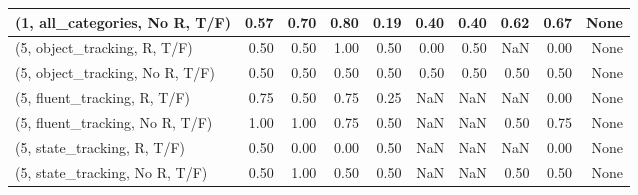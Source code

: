 \begin{table*}[h!]
\begin{adjustbox}{width=2\columnwidth,center}
\begin{tabular}{lrrr|rrr|rrr}
(1, all\_categories, No R, T/F)       &                      0.57 &                  0.70 &                      0.80 &                          0.19 &                      0.40 &                          0.40 &                                   0.62 &                               0.67 &                                  None \\



\midrule
(5, object\_tracking, R, T/F)         &                      0.50 &                  0.50 &                      1.00 &                          0.50 &                      0.00 &                          0.50 &                                    NaN &                               0.00 &                                  None \\
(5, object\_tracking, No R, T/F)      &                      0.50 &                  0.50 &                      0.50 &                          0.50 &                      0.50 &                          0.50 &                                   0.50 &                               0.50 &                                  None \\
(5, fluent\_tracking, R, T/F)         &                      0.75 &                  0.50 &                      0.75 &                          0.25 &                       NaN &                           NaN &                                    NaN &                               0.00 &                                  None \\
(5, fluent\_tracking, No R, T/F)      &                      1.00 &                  1.00 &                      0.75 &                          0.50 &                       NaN &                           NaN &                                   0.50 &                               0.75 &                                  None \\
(5, state\_tracking, R, T/F)          &                      0.50 &                  0.00 &                      0.00 &                          0.50 &                       NaN &                           NaN &                                    NaN &                               0.00 &                                  None \\
(5, state\_tracking, No R, T/F)       &                      0.50 &                  1.00 &                      0.50 &                          0.50 &                       NaN &                           NaN &                                   0.50 &                               0.50 &                                  None \\

\end{tabular}
\end{adjustbox}
\end{table*}
